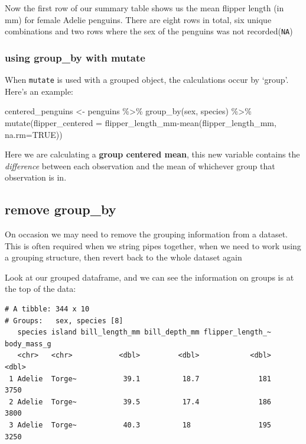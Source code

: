 \documentclass[
]{book}
\newenvironment{Shaded}{\begin{snugshade}}{\end{snugshade}}
\newcommand{\AttributeTok}[1]{\textcolor[rgb]{0.77,0.63,0.00}{#1}}
\newcommand{\ConstantTok}[1]{\textcolor[rgb]{0.00,0.00,0.00}{#1}}
\newcommand{\FunctionTok}[1]{\textcolor[rgb]{0.00,0.00,0.00}{#1}}
\newcommand{\NormalTok}[1]{#1}
\newcommand{\OtherTok}[1]{\textcolor[rgb]{0.56,0.35,0.01}{#1}}
\newcommand{\SpecialCharTok}[1]{\textcolor[rgb]{0.00,0.00,0.00}{#1}}
\begin{document}
Now the first row of our summary table shows us the mean flipper length (in mm) for female Adelie penguins. There are eight rows in total, six unique combinations and two rows where the sex of the penguins was not recorded(\texttt{NA})

\hypertarget{using-group_by-with-mutate}{%
\subsubsection{using group\_by with mutate}\label{using-group_by-with-mutate}}

When \texttt{mutate} is used with a grouped object, the calculations occur by `group'. Here's an example:

\begin{Shaded}
\begin{Highlighting}[]
\NormalTok{centered\_penguins }\OtherTok{\textless{}{-}}\NormalTok{ penguins }\SpecialCharTok{\%\textgreater{}\%} 
  \FunctionTok{group\_by}\NormalTok{(sex, species) }\SpecialCharTok{\%\textgreater{}\%} 
  \FunctionTok{mutate}\NormalTok{(}\AttributeTok{flipper\_centered =}\NormalTok{ flipper\_length\_mm}\SpecialCharTok{{-}}\FunctionTok{mean}\NormalTok{(flipper\_length\_mm, }\AttributeTok{na.rm=}\ConstantTok{TRUE}\NormalTok{))}
\end{Highlighting}
\end{Shaded}

Here we are calculating a \textbf{group centered mean}, this new variable contains the \emph{difference} between each observation and the mean of whichever group that observation is in.

\hypertarget{remove-group_by}{%
\subsection{remove group\_by}\label{remove-group_by}}

On occasion we may need to remove the grouping information from a dataset. This is often required when we string pipes together, when we need to work using a grouping structure, then revert back to the whole dataset again

Look at our grouped dataframe, and we can see the information on groups is at the top of the data:

\begin{verbatim}
# A tibble: 344 x 10
# Groups:   sex, species [8]
   species island bill_length_mm bill_depth_mm flipper_length_~ body_mass_g
   <chr>   <chr>           <dbl>         <dbl>            <dbl>       <dbl>
 1 Adelie  Torge~           39.1          18.7              181        3750
 2 Adelie  Torge~           39.5          17.4              186        3800
 3 Adelie  Torge~           40.3          18                195        3250
\end{verbatim}
\end{document}
